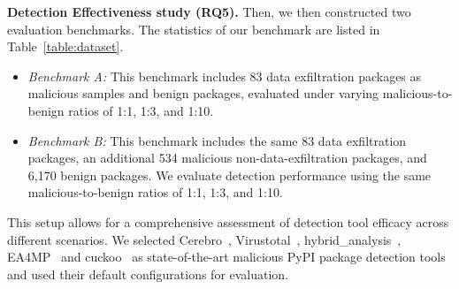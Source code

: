\textbf{Detection Effectiveness study (RQ5).} 
Then, we then constructed two evaluation benchmarks. The statistics of our benchmark are listed in Table~\ref{table:dataset}.

\begin{itemize}
\item \textit{Benchmark A:} This benchmark includes 83 data exfiltration packages as malicious samples and  benign packages, evaluated under varying malicious-to-benign ratios of 1:1, 1:3, and 1:10.
\item \textit{Benchmark B:} This benchmark includes the same 83 data exfiltration packages, an additional 534 malicious non-data-exfiltration packages, and 6,170 benign packages. We evaluate detection performance using the same malicious-to-benign ratios of 1:1, 1:3, and 1:10.
\end{itemize}

This setup allows for a comprehensive assessment of detection tool efficacy across different scenarios. We selected Cerebro~\cite{zhang2025killing}, Virustotal~\cite{VirusTotal}, hybrid\_analysis~\cite{HybridAnalysis}, EA4MP~\cite{sun2024integrating} and cuckoo~\cite{cuckoo} as state-of-the-art malicious PyPI package detection tools and used their default configurations for evaluation. 
